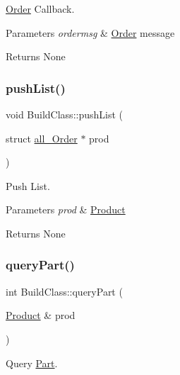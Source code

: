 \hyperlink{structOrder}{Order} Callback. 


\begin{DoxyParams}{Parameters}
{\em ordermsg} & \hyperlink{structOrder}{Order} message \\
\hline
\end{DoxyParams}
\begin{DoxyReturn}{Returns}
None 
\end{DoxyReturn}
\mbox{\label{classBuildClass_a64bc4cbe90399402e468f977e374f99e}} 
\subsubsection{\texorpdfstring{push\+List()}{pushList()}}
{\footnotesize\ttfamily void Build\+Class\+::push\+List (\begin{DoxyParamCaption}\item[{struct \hyperlink{structall__Order}{all\+\_\+\+Order} $\ast$}]{prod }\end{DoxyParamCaption})}



Push List. 


\begin{DoxyParams}{Parameters}
{\em prod} & \hyperlink{structProduct}{Product} \\
\hline
\end{DoxyParams}
\begin{DoxyReturn}{Returns}
None 
\end{DoxyReturn}
\mbox{\label{classBuildClass_acf20cc6dfbc979b0456b22a310627b42}} 
\subsubsection{\texorpdfstring{query\+Part()}{queryPart()}}
{\footnotesize\ttfamily int Build\+Class\+::query\+Part (\begin{DoxyParamCaption}\item[{\hyperlink{structProduct}{Product} \&}]{prod }\end{DoxyParamCaption})}



Query \hyperlink{structPart}{Part}. 


